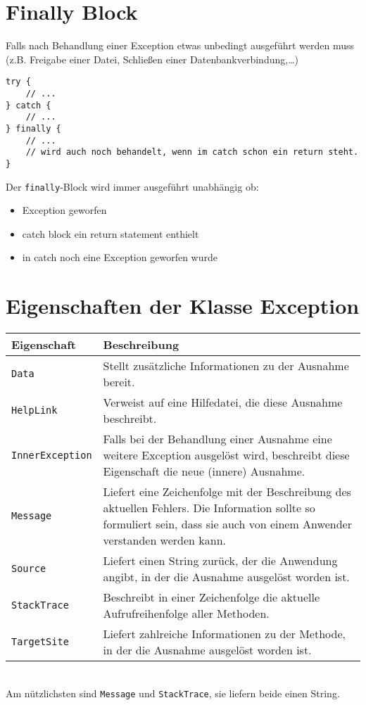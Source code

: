 \section{Finally Block}
Falls nach Behandlung einer Exception etwas unbedingt ausgeführt werden muss (z.B. Freigabe einer Datei, Schließen einer Datenbankverbindung,…)
\begin{lstlisting}[language={[Sharp]C}]
try {
	// ...
} catch {
	// ...
} finally {
	// ...
	// wird auch noch behandelt, wenn im catch schon ein return steht.
}
\end{lstlisting}
Der \lstinline$finally$-Block wird immer ausgeführt unabhängig ob:
\begin{itemize}
\item Exception geworfen
\item catch block ein return statement enthielt
\item in catch noch eine Exception geworfen wurde 
\end{itemize}

\section{Eigenschaften der Klasse Exception}

\begin{tabular}{L{.25} L{.75}}
Eigenschaft  & Beschreibung \\\hline
\lstinline$Data$ & Stellt zusätzliche Informationen zu der Ausnahme bereit.\\
\lstinline$HelpLink$ & Verweist auf eine Hilfedatei, die diese Ausnahme beschreibt.\\
\lstinline$InnerException$ & Falls bei der Behandlung einer Ausnahme eine weitere Exception ausgelöst wird, beschreibt diese Eigenschaft die neue (innere) Ausnahme. \\
\lstinline$Message$ & Liefert eine Zeichenfolge mit der Beschreibung des aktuellen Fehlers. Die Information sollte so formuliert sein, dass sie auch von einem Anwender verstanden werden kann. \\
\lstinline$Source$ & Liefert einen String zurück, der die Anwendung angibt, in der die Ausnahme ausgelöst worden ist. \\
\lstinline$StackTrace$ & Beschreibt in einer Zeichenfolge die aktuelle Aufrufreihenfolge aller Methoden.\\
\lstinline$TargetSite$ & Liefert zahlreiche Informationen zu der Methode, in der die Ausnahme ausgelöst worden ist. \\
\end{tabular}\\
Am nützlichsten sind \lstinline$Message$ und \lstinline$StackTrace$, sie liefern beide einen String.

